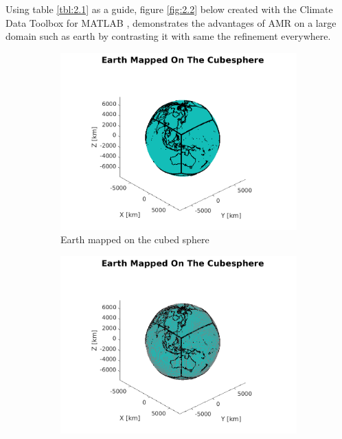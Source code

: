 \documentclass[twoside]{bsu-ms}
\begin{document}
\noindent Using table \ref{tbl:2.1} as a guide, figure \ref{fig:2.2} below created with the Climate Data Toolbox for MATLAB \cite{greene2019climate}, demonstrates the advantages of AMR on a large domain such as earth by contrasting it with same the refinement everywhere.
\begin{figure}[!htbp]
\centering
\begin{subfigure}{\textwidth}
  \centering
\includegraphics[height=0.27\textheight,clip=True,trim=1.8cm 0.6cm 2.6cm 2.6cm]{images/earth_cube.png}
  \caption{Earth mapped on the cubed sphere}
\end{subfigure}
\begin{subfigure}{\textwidth}
  \centering
\includegraphics[height=0.27\textheight,clip=True,trim=1.8cm 0.6cm 2.6cm 2.6cm]{images/earth_cube_mesh.png}

\end{subfigure}
\end{figure}
\end{document}
